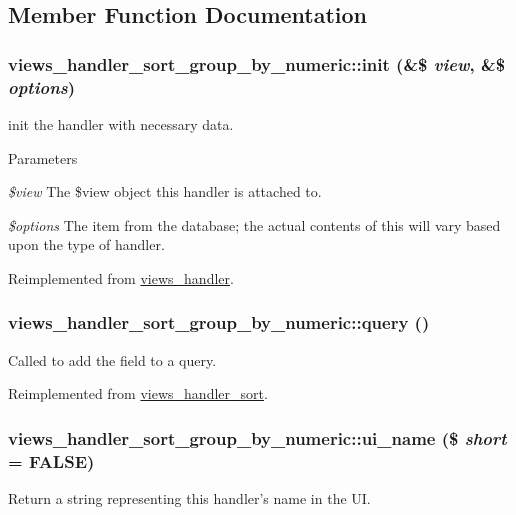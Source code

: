 \subsection{Member Function Documentation}
\hypertarget{classviews__handler__sort__group__by__numeric_a940de6f2bd43bf9987988c425ef48a7e}{
\subsubsection[{init}]{\setlength{\rightskip}{0pt plus 5cm}views\_\-handler\_\-sort\_\-group\_\-by\_\-numeric::init (\&\$ {\em view}, \/  \&\$ {\em options})}}
\label{classviews__handler__sort__group__by__numeric_a940de6f2bd43bf9987988c425ef48a7e}
init the handler with necessary data. 
\begin{DoxyParams}{Parameters}
\item[{\em \$view}]The \$view object this handler is attached to. \item[{\em \$options}]The item from the database; the actual contents of this will vary based upon the type of handler. \end{DoxyParams}


Reimplemented from \hyperlink{classviews__handler_aa7df174ffa94ab095f7b9fdf154bcc30}{views\_\-handler}.\hypertarget{classviews__handler__sort__group__by__numeric_ada5ef20a050242560d9da35ef2202d87}{
\subsubsection[{query}]{\setlength{\rightskip}{0pt plus 5cm}views\_\-handler\_\-sort\_\-group\_\-by\_\-numeric::query ()}}
\label{classviews__handler__sort__group__by__numeric_ada5ef20a050242560d9da35ef2202d87}
Called to add the field to a query. 

Reimplemented from \hyperlink{classviews__handler__sort_a94fa33c5d037e41a927583fce2df3d18}{views\_\-handler\_\-sort}.\hypertarget{classviews__handler__sort__group__by__numeric_a06f1b398512f9302298848b2122fa834}{
\subsubsection[{ui\_\-name}]{\setlength{\rightskip}{0pt plus 5cm}views\_\-handler\_\-sort\_\-group\_\-by\_\-numeric::ui\_\-name (\$ {\em short} = {\ttfamily FALSE})}}
\label{classviews__handler__sort__group__by__numeric_a06f1b398512f9302298848b2122fa834}
Return a string representing this handler's name in the UI. 

